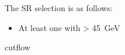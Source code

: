 The SR selection is as follows:
\begin{itemize}
\item At least one \bjet with \pT > \SI{45}{\GeV} 
\end{itemize}

\begin{sidewaystable}[p]
  \centering

  \caption{cutflow}%
  \label{tab:cutflow}

    
\end{sidewaystable}


